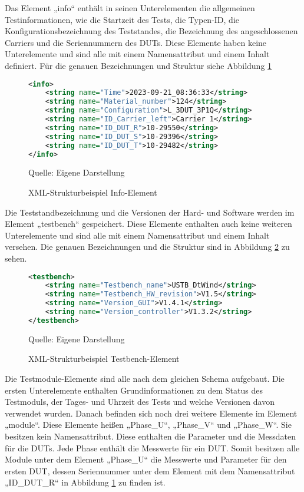 Das Element „info“ enthält in seinen Unterelementen die allgemeinen Testinformationen, wie die Startzeit des Tests,
die Typen-ID, die Konfigurationsbezeichnung des Teststandes, die Bezeichnung des angeschlossenen Carriers und die
Seriennummern des \ac{DUTs}. Diese Elemente haben keine Unterelemente und sind alle mit einem Namensattribut und einem Inhalt definiert.
Für die genauen Bezeichnungen und Struktur siehe Abbildung \ref{fig: XML-Strukturbeispiel Info-Element}

\begin{figure}[H]
\centering
\begin{minipage}{0.95\textwidth}
\begin{lstlisting}[language=XML]
<info>
	<string name="Time">2023-09-21_08:36:33</string>
	<string name="Material_number">124</string>
	<string name="Configuration">L_3DUT_3P1Q</string>
	<string name="ID_Carrier_left">Carrier 1</string>
	<string name="ID_DUT_R">10-29550</string>
	<string name="ID_DUT_S">10-29396</string>
    <string name="ID_DUT_T">10-29482</string>
</info>
\end{lstlisting}
\end{minipage}
\caption{XML-Strukturbeispiel Info-Element}
\label{fig: XML-Strukturbeispiel Info-Element}
    {Quelle: Eigene Darstellung}
\end{figure}

Die Teststandbezeichnung und die Versionen der Hard- und Software werden im Element „testbench“ gespeichert.
Diese Elemente enthalten auch keine weiteren Unterelemente und sind alle mit einem Namensattribut und einem Inhalt versehen.
Die genauen Bezeichnungen und die Struktur sind in Abbildung \ref{fig: XML-Strukturbeispiel Testbench-Element} zu sehen.

\begin{figure}[H]
\centering
\begin{minipage}{0.95\textwidth}
\begin{lstlisting}[language=XML]
<testbench>
	<string name="Testbench_name">USTB_DtWind</string>
	<string name="Testbench_HW_revision">V1.5</string>
	<string name="Version_GUI">V1.4.1</string>
    <string name="Version_controller">V1.3.2</string>
</testbench>
\end{lstlisting}
\end{minipage}
\caption{XML-Strukturbeispiel Testbench-Element}
\label{fig: XML-Strukturbeispiel Testbench-Element}
    {Quelle: Eigene Darstellung}
\end{figure}


Die Testmodule-Elemente sind alle nach dem gleichen Schema aufgebaut. Die ersten Unterelemente enthalten Grundinformationen
zu dem Status des Testmoduls, der Tages- und Uhrzeit des Tests und welche Versionen davon verwendet wurden.
Danach befinden sich noch drei weitere Elemente im Element „module“. Diese Elemente heißen „Phase_U“, „Phase_V“ und „Phase_W“.
Sie besitzen kein Namensattribut. Diese enthalten die Parameter und die Messdaten für die DUTs. Jede Phase enthält die Messwerte für ein DUT.
Somit besitzen alle Module unter dem Element „Phase_U“ die Messwerte und Parameter für den ersten DUT, dessen Seriennummer
unter dem Element mit dem Namensattribut „ID_DUT_R“ in Abbildung \ref{fig: XML-Strukturbeispiel Info-Element} zu finden ist.

